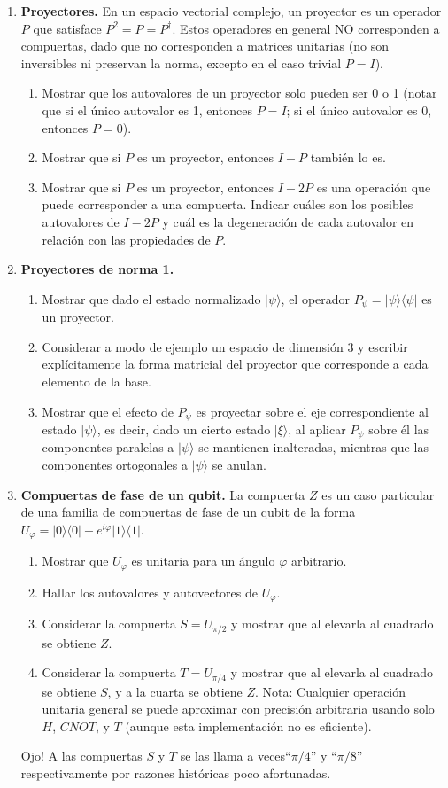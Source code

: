 \documentclass[a4paper,11pt,spanish]{article}
\newcommand{\ket}[1]{|#1\rangle}
\newcommand{\bra}[1]{\langle #1|}
\newcommand{\ketbra}[2]{\ket{#1}\bra{#2}}
\newcommand{\proj}[1]{\ketbra {#1}{#1}}
\begin{document}
\begin{enumerate}
 \item {\bf Proyectores.} En un espacio vectorial complejo, un proyector es un operador $P$ que satisface $P^2 = P = P^\dagger$. Estos operadores en general NO corresponden a compuertas, dado que no corresponden a matrices unitarias (no son inversibles ni preservan la norma, excepto en el caso trivial $P=I$).
 \begin{enumerate}
  \item Mostrar que los autovalores de un proyector solo pueden ser 0 o 1 (notar que si el único autovalor es 1, entonces $P=I$; si el único autovalor es 0, entonces $P=0$).
  \item Mostrar que si $P$ es un proyector, entonces $I-P$ tambi\'en lo es.
  \item Mostrar que si $P$ es un proyector, entonces $I - 2P$ es una operación que puede corresponder a una compuerta. Indicar cuáles son los posibles autovalores de $I-2P$ y cuál es la degeneración de cada autovalor en relación con las propiedades de $P$.
 \end{enumerate}
 
 \item {\bf Proyectores de norma 1.}
 \begin{enumerate}
  \item Mostrar que dado el estado normalizado $\ket{\psi}$, el operador $P_\psi=\ket{\psi}\bra{\psi}$ es un proyector.
  \item Considerar a modo de ejemplo un espacio de dimensi\'on 3 y escribir expl\'icitamente la forma matricial del proyector que corresponde a cada elemento de la base.
  \item Mostrar que el efecto de $P_\psi$ es proyectar sobre el eje correspondiente al estado $\ket{\psi}$, es decir, dado un cierto estado $\ket{\xi}$, al aplicar $P_\psi$ sobre \'el las componentes paralelas a $\ket{\psi}$ se mantienen inalteradas, mientras que las componentes ortogonales a $\ket{\psi}$ se anulan.
 \end{enumerate}
 
   \item {\bf Compuertas de fase de un qubit.} La compuerta $Z$ es un caso particular de una familia de compuertas de fase de un qubit de la forma $U_\varphi = \proj{0} + e^{i\varphi} \proj{1}$. 
  \begin{enumerate}
   \item Mostrar que $U_\varphi$ es unitaria para un \'angulo $\varphi$ arbitrario.
   \item Hallar los autovalores y autovectores de $U_\varphi$. 
   \item Considerar la compuerta $S=U_{\pi/2}$ y mostrar que al elevarla al cuadrado se obtiene $Z$.
   \item Considerar la compuerta $T=U_{\pi/4}$ y mostrar que al elevarla al cuadrado se obtiene $S$, y a la cuarta se obtiene $Z$. Nota: Cualquier operaci\'on unitaria general se puede aproximar con precisi\'on arbitraria usando solo $H$, $CNOT$, y $T$ (aunque esta implementaci\'on no es eficiente).
  \end{enumerate}
   Ojo! A las compuertas $S$ y $T$ se las llama a veces``$\pi/4$'' y ``$\pi/8$'' respectivamente por razones hist\'oricas poco afortunadas.


\end{enumerate}
\end{document}
